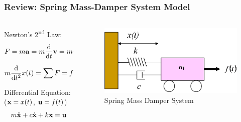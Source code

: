 \documentclass[aspectratio=169,handout]{beamer}
\begin{document}
\begin{frame}
	\frametitle{Review: Spring Mass-Damper System Model}
	\begin{columns}
		\begin{column}{0.5 \textwidth}
			Newton's 2\textsuperscript{nd} Law:
			\[
				F = m \vb{a} 
				= m \dv{t} \vb{v} 
				= m \dv{t} \qty(\dv{t} \vb{x})
			\]
			\[
				m \dv{t^2} x(t) 
				= \sum F 
				= f(t) - b \dv{t} x(t) - k x(t)
			\] 
			\vspace{1em}

			Differential Equation: ($\vb{x} = x(t)$, $\vb{u} = f(t)$)
			\[
				m \ddot{\vb{x}} + c \dot{\vb{x}} + k \vb{x} = \vb{u}
			\]
			
		\end{column}
		\begin{column}{0.375 \textwidth}
			\begin{figure}[]
				\includegraphics[width=\textwidth]{Images/SpringMassDamper_cartSystem.png}
				Spring Mass Damper System \cite{ctms_engin_umich_SystemModeling}
			\end{figure}
		\end{column}
	\end{columns}
\end{frame}
\end{document}
